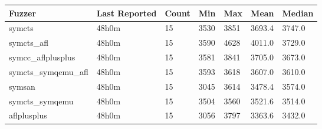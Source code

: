 
\begin{table*}[h]
\centering
\begin{tabular}{|l|l|l|l|l|l|l|}
\hline
\textbf{Fuzzer} & \textbf{Last Reported} & \textbf{Count} & \textbf{Min} & \textbf{Max} & \textbf{Mean} & \textbf{Median} \\
\hline
symcts             & 48h0m              & 15     & 3530  & 3851  & 3693.4        & 3747.0     \\
symcts\_afl        & 48h0m              & 15     & 3590  & 4628  & 4011.0        & 3729.0     \\
symcc\_aflplusplus & 48h0m              & 15     & 3581  & 3841  & 3705.0        & 3673.0     \\
symcts\_symqemu\_afl & 48h0m              & 15     & 3593  & 3618  & 3607.0        & 3610.0     \\
symsan             & 48h0m              & 15     & 3045  & 3614  & 3478.4        & 3574.0     \\
symcts\_symqemu    & 48h0m              & 15     & 3504  & 3560  & 3521.6        & 3514.0     \\
aflplusplus        & 48h0m              & 15     & 3056  & 3797  & 3363.6        & 3432.0     \\
\hline
\end{tabular}
\end{table*}